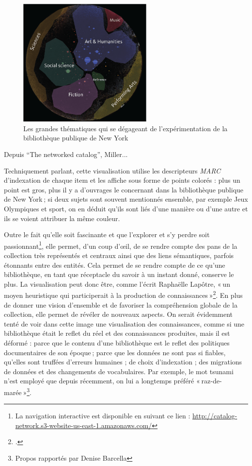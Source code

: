 \begin{figure}[h!]
	\centering
	\includegraphics[width=0.6\textwidth]{images/image12.png}
	\caption{Les grandes thématiques qui se dégageant de l'expérimentation de la bibliothèque publique de New York}
	\label{fig:image12}
\end{figure}

\begin{center}
	Depuis \enquote{The networked catalog}, Miller...
\end{center}


Techniquement parlant, cette visualisation utilise les descripteurs \textit{MARC} d’indexation de chaque item et les affiche sous forme de points colorés : plus un point est gros, plus il y a d’ouvrages le concernant dans la bibliothèque publique de New York ; si deux sujets sont souvent mentionnés ensemble, par exemple Jeux Olympiques et sport, on en déduit qu’ils sont liés d’une manière ou d’une autre et ils se voient attribuer la même couleur.

Outre le fait qu’elle soit fascinante et que l’explorer et s’y perdre soit passionnant\footnote{La navigation interactive est disponible en suivant ce lien : \url{ http://catalog-network.s3-website-us-east-1.amazonaws.com/}}, elle permet, d’un coup d’œil, de se rendre compte des pans de la collection très représentés et centraux ainsi que des liens sémantiques, parfois étonnants entre des entités. Cela permet de se rendre compte de ce qu’une bibliothèque, en tant que réceptacle du savoir à un instant donné, conserve le plus. La visualisation peut donc être, comme l’écrit Raphaëlle Lapôtre, « un moyen heuristique qui participerait à la production de connaissances »\footcite[§ 23]{lapotre_visualiser_2016}. En plus de donner une vision d’ensemble et de favoriser la compréhension globale de la collection, elle permet de révéler de nouveaux aspects. On serait évidemment tenté de voir dans cette image une visualisation des connaissances, comme si une bibliothèque était le reflet du réel et des connaissances produites, mais il est déformé : parce que le contenu d’une bibliothèque est le reflet des politiques documentaires de son époque ; parce que les données ne sont pas si fiables, qu’elles sont truffées d’erreurs humaines ; de choix d’indexation ; des migrations de données et des changements de vocabulaires. Par exemple, le mot tsunami n’est employé que depuis récemment, on lui a longtemps préféré « raz-de-marée »\footnote{Propos rapportés par Denise Barcella}.

